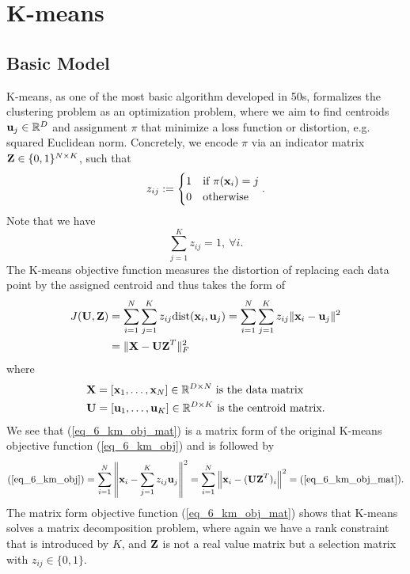 \documentclass[../main.tex]{subfiles}
\begin{document}
\section{K-means}
\subsection{Basic Model}
K-means, as one of the most basic algorithm developed in 50s, formalizes the clustering problem as an optimization problem, where we aim to find centroids ${\bf u}_j\in\mathbb{R}^D$ and assignment $\pi$ that minimize a loss function or distortion, e.g. squared Euclidean norm. Concretely, we encode $\pi$ via an indicator matrix ${\bf Z}\in \{0,1\}^{N\times K}$, such that
\begin{equation*}
z_{ij}:=\begin{cases}
1&\text{if }\pi({\bf x}_i)=j\\
0&\text{otherwise}
\end{cases}.
\end{equation*}
Note that we have
\begin{equation*}
\sum_{j=1}^{K} z_{ij} = 1,\ \forall i.
\end{equation*}
The K-means objective function measures the distortion of replacing each data point by the assigned centroid and thus takes the form of
\begin{align}
\label{eq_6_km_obj}J({\bf U, Z})&=\sum_{i=1}^{N}\sum_{j=1}^{K} z_{ij}{\rm dist}({\bf x}_i, {\bf u}_j)=\sum_{i=1}^{N}\sum_{j=1}^{K} z_{ij}\|{\bf x}_i-{\bf u}_j\|^2\\
\label{eq_6_km_obj_mat}&=\|{\bf X-UZ}^T\|^2_F
\end{align}
where
\begin{align*}
&{\bf X} = [{\bf x}_1,\dots,{\bf x}_N]\in \mathbb{R}^{D\times N}\ \text{is the data matrix}\\
&{\bf U} = [{\bf u}_1,\dots,{\bf u}_K]\in \mathbb{R}^{D\times K}\ \text{is the centroid matrix.}
\end{align*}
We see that (\ref{eq_6_km_obj_mat}) is a matrix form of the original K-means objective function (\ref{eq_6_km_obj}) and is followed by
\begin{equation*}
(\ref{eq_6_km_obj}) = \sum_{i=1}^{N}\left\|{\bf x}_i-\sum_{j=1}^{K} z_{ij}{\bf u}_j\right\|^2 =  \sum_{i=1}^{N}\left\|{\bf x}_i-({\bf UZ}^T)_i\right\|^2 =(\ref{eq_6_km_obj_mat}).
\end{equation*}
The matrix form objective function (\ref{eq_6_km_obj_mat}) shows that K-means solves a matrix decomposition problem, where again we have a rank constraint that is introduced by $K$, and ${\bf Z}$ is not a real value matrix but a selection matrix with $z_{ij}\in\{0,1\}$.
\end{document}
